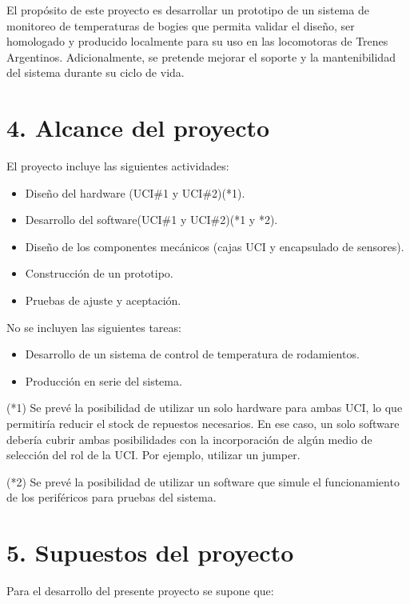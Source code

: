 \documentclass[
11pt, %
codirector, %
]{charter}
\begin{document}
El propósito de este proyecto es desarrollar un prototipo de un sistema de monitoreo de temperaturas de bogies que permita validar el diseño, ser homologado y producido localmente para su uso en las locomotoras de Trenes Argentinos. Adicionalmente, se pretende mejorar el soporte y la mantenibilidad del sistema durante su ciclo de vida.


\section{4. Alcance del proyecto}
\label{sec:alcance}

El proyecto incluye las siguientes actividades:
\begin{itemize}
\item Diseño del hardware (UCI\#1 y UCI\#2)(*1).
\item Desarrollo del software(UCI\#1 y UCI\#2)(*1 y *2).
\item Diseño de los componentes mecánicos (cajas UCI y encapsulado de sensores).
\item Construcción de un prototipo.
\item Pruebas de ajuste y aceptación.
\end{itemize}
No se incluyen las siguientes tareas: 
\begin{itemize}
\item Desarrollo de un sistema de control de temperatura de rodamientos.
\item Producción en serie del sistema.
\end{itemize}
(*1) Se prevé la posibilidad de utilizar un solo hardware para ambas UCI, lo que permitiría reducir el stock de repuestos necesarios. En ese caso, un solo software debería cubrir ambas posibilidades con la incorporación de algún medio de selección del rol de la UCI. Por ejemplo, utilizar un jumper.

(*2) Se prevé la posibilidad de utilizar un software que simule el funcionamiento de los periféricos para pruebas del sistema.

\section{5. Supuestos del proyecto}
\label{sec:supuestos}

Para el desarrollo del presente proyecto se supone que:
\end{document}
